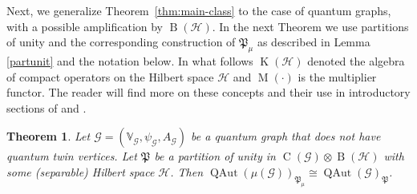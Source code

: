 \documentclass[11pt,reqno]{amsart}
\newtheorem{theorem}[proposition]{Theorem}
\newcommand{\tens}{\otimes}
\DeclareMathOperator{\QAut}{QAut}
\DeclareMathOperator{\B}{B}
\DeclareMathOperator{\C}{C}
\DeclareMathOperator{\M}{M}
\DeclareMathOperator{\K}{K}
\begin{document}
Next, we generalize Theorem~\ref{thm:main-class} to the case of quantum graphs, with a possible amplification by $\B(\mathscr{H})$. In the next Theorem we use partitions of unity and the corresponding construction of $\mathfrak{P}_{\mu}$  as described in Lemma \ref{partunit} and the notation below. In what follows $\K(\mathscr{H})$ denoted the algebra of compact operators on the Hilbert space $\mathscr{H}$ and $\M(\cdot)$ is the multiplier functor. The reader will find more on these concepts and their use in introductory sections of \cite{Woronowicz95} and \cite{unbo}.

\begin{theorem}\label{auto_M}
Let $\mathcal{G}=(\mathbb{V}_{\scriptscriptstyle\mathcal{G}},\psi_{\scriptscriptstyle\mathcal{G}}, A_{\scriptscriptstyle\mathcal{G}})$ be a quantum graph that does not have quantum twin vertices.   Let $\mathfrak{P}$ be a partition of unity in $\C(\mathcal{G})\tens\B(\mathscr{H})$ with some (separable) Hilbert space $\mathscr{H}$. Then $\QAut(\mu(\mathcal{G}))_{\mathfrak{P}_{\mu}}\cong\QAut(\mathcal{G})_{\mathfrak{P}}$.
\end{theorem}
\end{document}
